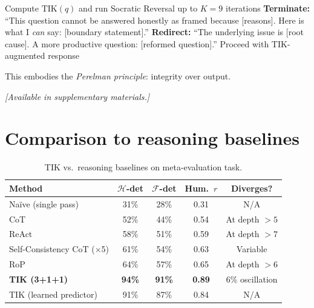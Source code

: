 \documentclass[11pt]{article}
\newcommand{\TIK}{\text{TIK}}
\begin{document}
\begin{algorithm}[h]
\caption{Termination Protocol}
\begin{algorithmic}[1]
\STATE Compute $\TIK(q)$ and run Socratic Reversal up to $K=9$ iterations
\STATE \textbf{Terminate:} ``This question cannot be answered honestly as framed because [reasons]. Here is what I \textit{can} say: [boundary statement].''
\ENDIF
{}
\STATE \textbf{Redirect:} ``The underlying issue is [root cause]. A more productive question: [reformed question].''
\ELSE
\STATE Proceed with TIK-augmented response
\ENDIF
\end{algorithmic}
\end{algorithm}

This embodies the \textit{Perelman principle}: integrity over output.

\textit{[Available in supplementary materials.]}


\section{Comparison to reasoning baselines}
\label{app:baselines}

\begin{table}[h]
\centering
\small
\caption{TIK vs.\ reasoning baselines on meta-evaluation task.}
\begin{tabular}{lcccc}
\toprule
\textbf{Method} & $\mathcal{H}$\textbf{-det} & $\mathcal{F}$\textbf{-det} & \textbf{Hum.}\ $r$ & \textbf{Diverges?} \\
\midrule
Na\"ive (single pass) & 31\% & 28\% & 0.31 & N/A \\
CoT~\citep{wei2022chain} & 52\% & 44\% & 0.54 & At depth $>5$ \\
ReAct~\citep{yao2023react} & 58\% & 51\% & 0.59 & At depth $>7$ \\
Self-Consistency CoT ($\times$5) & 61\% & 54\% & 0.63 & Variable \\
RoP~\citep{cao2024rop} & 64\% & 57\% & 0.65 & At depth $>6$ \\
\midrule
\textbf{TIK (3+1+1)} & \textbf{94\%} & \textbf{91\%} & \textbf{0.89} & 6\% oscillation \\
TIK (learned predictor) & 91\% & 87\% & 0.84 & N/A \\
\bottomrule
\end{tabular}
\end{table}
\end{document}
